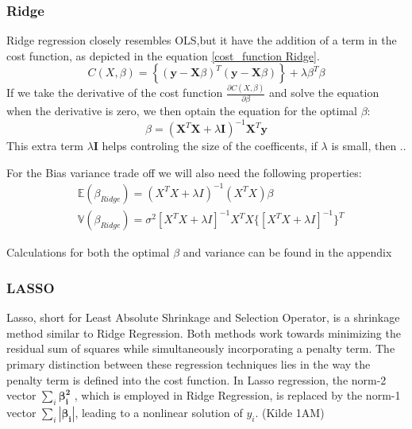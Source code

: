 \subsubsection{Ridge}
\noindent Ridge regression closely resembles OLS,but it have the addition of a term in the 
cost function, as depicted in the equation \eqref{cost_function Ridge}.
\begin{equation}
    C(X,\beta) =  \left\lbrace ( \textbf{y} - \textbf{X}\beta )^T (\textbf{y} - \textbf{X}\beta)\right\rbrace + \lambda \beta^T \beta \label{cost_function Ridge}
\end{equation}
If we take the derivative of the cost function $\frac{\partial C(X, \beta)}{\partial \beta}$ and 
solve the equation when the derivative is zero, we then optain the equation for the optimal $\beta$:
\begin{equation}
    \beta = (\textbf{X}^T \textbf{X} + \lambda \textbf{I})^{-1}\textbf{X}^T \textbf{y} \label{beta ridge}
\end{equation}
This extra term $\lambda \textbf{I}$ helps controling the size of the coefficents, if $\lambda$ is 
small, then ..

For the Bias variance trade off we will also need the following properties:
\begin{align}
    & \mathbb{E}(\beta_{Ridge}) = (X^T X + \lambda I )^{-1}(X^T X)\beta\\
    & \mathbb{V}(\beta_{Ridge}) = \sigma^2[X^T X + \lambda I]^{-1} X^T X \{[X^T X + \lambda I]^{-1}\}^T
\end{align}

Calculations for both the optimal $\beta$ and variance can be found in the appendix

\subsubsection{LASSO}

\noindent Lasso, short for Least Absolute Shrinkage and Selection Operator, is a shrinkage method similar to Ridge Regression. Both
methods work towards minimizing the residual sum of squares while simultaneously incorporating a penalty term. The primary distinction
between these regression techniques lies in the way the penalty term is defined into the cost function.
\noindent In Lasso regression, the norm-2 vector $\sum_{i} \boldsymbol{\beta_i^2}$ , which is employed in Ridge Regression, is replaced by
the norm-1 vector $\sum_{i} 
|\boldsymbol{\beta_i}|$, leading to a nonlinear solution of $y_i$. (Kilde 1AM)

